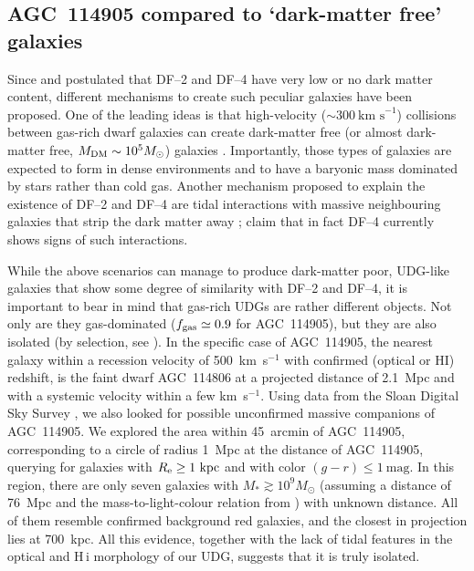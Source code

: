 \documentclass[fleqn,usenatbib]{mnras}
\begin{document}
\subsection{AGC~114905 compared to `dark-matter free' galaxies}

Since \citet{vandokkum_DF2} and \citet{vandokkum_DF4} postulated that DF--2 and DF--4 have very low or no dark matter content, different mechanisms to create such peculiar galaxies have been proposed. One of the leading ideas is that high-velocity ($\sim 300~\textrm{km s}^{-1}$) collisions between gas-rich dwarf galaxies can create dark-matter free (or almost dark-matter free, $M_{\rm DM} \sim 10^5 M_\odot$) galaxies \citep{silk_udgs,shin_udgs}. Importantly, those types of galaxies are expected to form in dense environments and to have a baryonic mass dominated by stars rather than cold gas. Another mechanism proposed to explain the existence of DF--2 and DF--4 are tidal interactions with massive neighbouring galaxies that strip the dark matter away \citep{jackson_tidalUDGs,doppel_udgs}; \citet{montes_df4} claim that in fact DF--4 currently shows signs of such interactions. 

While the above scenarios can manage to produce dark-matter poor, UDG-like galaxies that show some degree of similarity with DF--2 and DF--4, it is important to bear in mind that gas-rich UDGs are rather different objects. Not only are they gas-dominated ($f_{\rm gas} \simeq 0.9$ for AGC~114905), but they are also isolated (by selection, see \citealt{leisman2017}). In the specific case of AGC~114905, the nearest galaxy within a recession velocity of 500~km~s$^{-1}$ with confirmed (optical or HI) redshift, is the faint dwarf AGC~114806 at a projected distance of 2.1~Mpc and with a systemic velocity within a few km~s$^{-1}$. Using data from the Sloan Digital Sky Survey \citep{sdss_dr12}, we also looked for possible unconfirmed massive companions of AGC~114905. We explored the area within 45~arcmin of AGC~114905, corresponding to a circle of radius 1~Mpc at the distance of AGC~114905, querying for galaxies with $R_{\rm e} \geq 1~\textrm{kpc}$ and with color $(g-r) 
\leq 1~\textrm{mag}$. In this region, there are only seven galaxies with $M_\ast \gtrsim 10^9 M_\odot$ (assuming a distance of 76~Mpc and the mass-to-light-colour relation from \citealt{du2020}) with unknown distance. All of them resemble confirmed background red galaxies, and the closest in projection lies at 700~kpc. All this evidence, together with the lack of tidal features in the optical and H\,{\sc i} morphology of our UDG, suggests that it is truly isolated.
\end{document}
